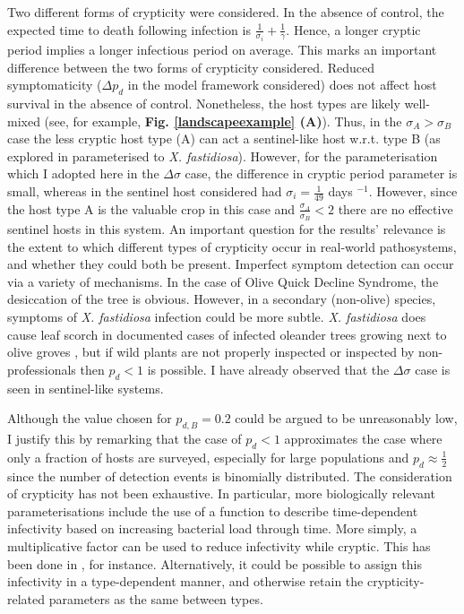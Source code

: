 \documentclass[11pt,letterpaper]{article}
\begin{document}
Two different forms of crypticity were considered. In the absence of control, the expected time to death following infection is $\frac{1}{\sigma_{i}} + \frac{1}{\gamma}$. Hence, a longer cryptic period implies a longer infectious period on average. This marks an important difference between the two forms of crypticity considered. Reduced symptomaticity ($\Delta p_d$ in the model framework considered) does not affect host survival in the absence of control. 
 Nonetheless, the host types are likely well-mixed (see, for example, \textbf{Fig. \ref{landscapeexample} (A)}). Thus, in the $\sigma_{A} > \sigma_{B}$ case the less cryptic host type (A) can act a sentinel-like host w.r.t. type B (as explored in \cite{Lovell-Read2023} parameterised to \emph{X. fastidiosa}). However, for the parameterisation which I adopted here in the $\Delta \sigma$ case, the difference in cryptic period parameter is small, whereas in \cite{Lovell-Read2023} the sentinel host considered had $\sigma_{i} = \frac{1}{49}$ days $^{-1}$. However, since the host type A is the valuable crop in this case and $\frac{\sigma_{A}}{\sigma_{B}} < 2$ there are no effective sentinel hosts in this system.
An important question for the results' relevance is the extent to which different types of crypticity occur in real-world pathosystems, and whether they could both be present. Imperfect symptom detection can occur via a variety of mechanisms. In the case of Olive Quick Decline Syndrome, the desiccation of the tree is obvious. However, in a secondary (non-olive) species, symptoms of \emph{X. fastidiosa} infection could be more subtle. \emph{X. fastidiosa} does cause leaf scorch in documented cases of infected oleander trees growing next to olive groves \cite{Saponari2013}, but if wild plants are not properly inspected or inspected by non-professionals then $p_d < 1$ is possible. I have already observed that the $\Delta \sigma$ case is seen in sentinel-like systems.

Although the value chosen for $p_{d,B} = 0.2$ could be argued to be unreasonably low, I justify this by remarking that the case of $p_d < 1$ approximates the case where only a fraction of hosts are surveyed, especially for large populations and $p_d \approx \frac{1}{2}$ since the number of detection events is binomially distributed. The consideration of crypticity has not been exhaustive. In particular, more biologically relevant parameterisations include the use of a function to describe time-dependent infectivity based on increasing bacterial load through time. More simply, a multiplicative factor can be used to reduce infectivity while cryptic. This has been done in \cite{Cendoya2024}, for instance. Alternatively, it could be possible to assign this infectivity in a type-dependent manner, and otherwise retain the crypticity-related parameters as the same between types.
\end{document}
